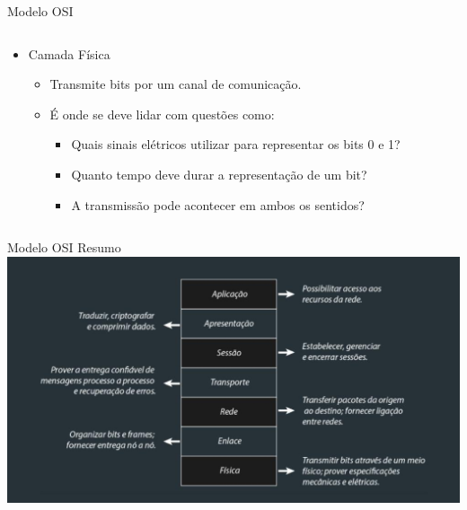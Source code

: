 \documentclass{libs/ufc_format}
\begin{document}
\begin{frame}{Modelo OSI}
\begin{columns}
        \begin{column}{0.65\textwidth}
            \begin{itemize}
                \item Camada Física
                    \begin{itemize}
                        \justifying
                        \item<2> Transmite bits por um canal de comunicação.
                        \item<2> É onde se deve lidar com questões como:
                            \begin{itemize}
                                \justifying
                                \item<2> Quais sinais elétricos utilizar para representar os bits 0 e 1?
                                \item<2> Quanto tempo deve durar a representação de um bit?
                                \item<2> A transmissão pode acontecer em ambos os sentidos?
                            \end{itemize}
                    \end{itemize}
            \end{itemize}
        \end{column}
    \end{columns}
\end{frame}

\begin{frame}{Modelo OSI}
    \centering
    Resumo\\
    \includegraphics[width=\textwidth]{media/osi_resumo}
\end{frame}


\end{document}
